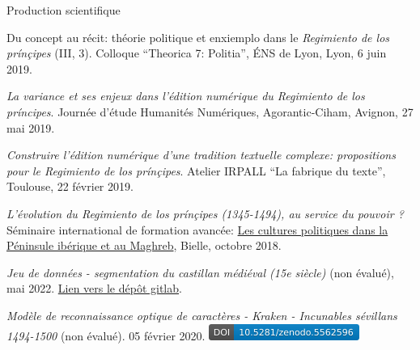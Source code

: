 \begin{rubric}{Production scientifique}
                    \entry*
                
                        Du concept au récit: théorie politique et
                                enxiemplo dans le \textit{Regimiento de los prínçipes} (III,
                            3). Colloque \enquote{Theorica 7: Politia}, ÉNS de Lyon, Lyon, 6
                        juin 2019. 
                    
                    \entry*
                \textit{La variance et ses enjeux dans l'édition numérique du \textit{Regimiento
                                de los príncipes}}. Journée d'étude Humanités Numériques,
                        Agorantic-Ciham, Avignon, 27 mai 2019.
                    
                    \entry*
                \textit{Construire l'édition numérique d'une tradition textuelle complexe:
                            propositions pour le \textit{Regimiento de los prínçipes}}. Atelier
                        IRPALL \enquote{La fabrique du texte}, Toulouse, 22 février
                        2019.
                    
                    \entry*
                \textit{L'évolution du \textit{Regimiento de los prínçipes} (1345-1494), au
                            service du pouvoir ?} Séminaire international de formation avancée:
                            \href{https://recherche.univ-pau.fr/fr/accueil/cpim.html}{Les cultures
                            politiques dans la Péninsule ibérique et au Maghreb},
                            Bielle, octobre 2018. 
            \vspace{1cm}
            
            
                    
                    \entry*
                \textit{ Jeu de données - segmentation du castillan médiéval (15e
                            siècle)} (non évalué), mai 2022. \href{https://gitlab.huma-num.fr/mgillelevenson/dataset_segmentation_castillan_medieval}{Lien vers le dépôt gitlab}.
                    
                    \entry*
                \textit{Modèle de reconnaissance optique de caractères - Kraken - Incunables
                            sévillans 1494-1500} (non évalué). 05 février 2020. \href{https://zenodo.org/record/5562596}{\includegraphics[scale=0.73]{img/doi_zenodo_inc_901.png}}
            \vspace{1cm}
            

\end{rubric}
